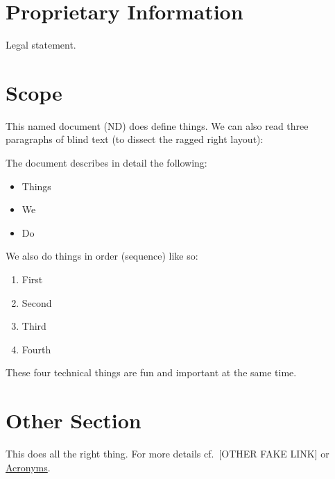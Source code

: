 \documentclass[american,paper=a4,captions=tableheading]{scrartcl}
\begin{document}
\hypertarget{proprietary-information}{%
\section*{Proprietary Information}\label{proprietary-information}}

Legal statement.

\newpage
\renewcommand*\contentsname{Table of Contents}
{
\setcounter{tocdepth}{2}
\tableofcontents
}
\listoftables
\newpage
\listoffigures
\newpage

\hypertarget{scope}{%
\section{Scope}\label{scope}}

This named document (ND) does define things.
We can also read three paragraphs of blind text (to dissect the ragged right layout):

\lipsum[2-3][1-2]

\lipsum[3-9][4-8]

\lipsum[1-2][3-4]

The document describes in detail the following:

\begin{itemize}
\tightlist
\item
  Things
\item
  We
\item
  Do
\end{itemize}

We also do things in order (sequence) like so:

\begin{enumerate}
\def\labelenumi{\arabic{enumi}.}
\tightlist
\item
  First
\item
  Second
\item
  Third
\item
  Fourth
\end{enumerate}

These four technical things are fun and important at the same time.

\hypertarget{other-section}{%
\section{Other Section}\label{other-section}}

This does all the right thing. For more details cf.~{[}OTHER FAKE LINK{]}
or \hyperref[acronyms]{\color{some-blue}Acronyms}.
\end{document}
